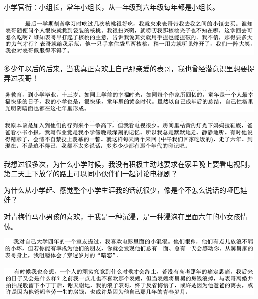 \documentclass[9pt, b5paper]{article}
\begin{document}
小学官衔：小组长，常年小组长，从一年级到六年级每年都是小组长。

\begin{center}
\includegraphics[width=.9\linewidth]{./pic/backups_plans_20210422_080215.png}
\end{center}

多少年以后的后来，当我真正喜欢上自己那亲爱的表哥，我也曾经潜意识里想要捉弄过表哥！

\begin{center}
\includegraphics[width=.9\linewidth]{./pic/backups_plans_20210422_100000.png}
\end{center}

\begin{center}
\includegraphics[width=.9\linewidth]{./pic/backups_plans_20210422_074743.png}
\end{center}

我想过很多次，为什么小学时候，我没有积极主动地要求在家里晚上要看电视剧，第二天上下放学的路上可以同小伙伴们一起讨论电视剧？

为什么从小学起、感觉整个小学生涯我的话就很少，像是个不怎么说话的哑巴娃娃？

对青梅竹马小男孩的喜欢，于我是一种沉浸，是一种浸泡在里面六年的小女孩情愫。

\begin{center}
\includegraphics[width=.9\linewidth]{./pic/backups_plans_20210422_112117.png}
\end{center}

\begin{center}
\includegraphics[width=.9\linewidth]{./pic/backups_plans_20210422_112135.png}
\end{center}
\end{document}
